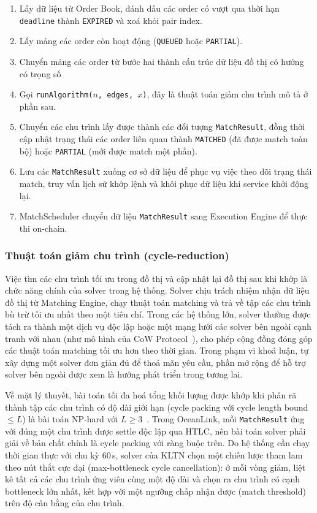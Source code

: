 \begin{enumerate}
    \item Lấy dữ liệu từ Order Book, đánh dấu các order có vượt qua thời hạn \texttt{deadline} thành \texttt{EXPIRED} và xoá khỏi pair index.
    \item Lấy mảng các order còn hoạt động (\texttt{QUEUED} hoặc \texttt{PARTIAL}).
    \item Chuyển mảng các order từ bước hai thành cấu trúc dữ liệu đồ thị có hướng có trọng số
    \item Gọi \texttt{runAlgorithm($n$, edges, $x$)}, đây là thuật toán giảm chu trình mô tả ở phần sau.
    \item Chuyển các chu trình lấy được thành các đối tượng \texttt{MatchResult}, đồng thời cập nhật trạng thái các order liên quan thành \texttt{MATCHED} (đã được match toàn bộ) hoặc \texttt{PARTIAL} (mới được match một phần).
    \item Lưu các \texttt{MatchResult} xuống cơ sở dữ liệu để phục vụ việc theo dõi trạng thái match, truy vấn lịch sử khớp lệnh và khôi phục dữ liệu khi service khởi động lại.
    \item MatchScheduler chuyển dữ liệu \texttt{MatchResult} sang Execution Engine để thực thi on-chain.
\end{enumerate}

\subsubsection{Thuật toán giảm chu trình (cycle-reduction)}

Việc tìm các chu trình tối ưu trong đồ thị và cập nhật lại đồ thị sau khi khớp
là chức năng chính của solver trong hệ thống.
Solver chịu trách nhiệm
nhận dữ liệu đồ thị từ Matching Engine, 
chạy thuật toán matching và trả về
tập các chu trình bù trừ tối ưu nhất theo một tiêu chí. 
Trong các hệ
thống lớn, solver thường được tách ra thành một dịch vụ độc lập hoặc
một mạng lưới các
solver bên ngoài cạnh tranh với nhau (như mô hình của CoW Protocol~\cite{cow_protocol_docs}),
cho phép cộng
đồng đóng góp các thuật toán matching tối ưu hơn theo thời gian.
Trong phạm vi
khoá luận, tự xây dựng một solver đơn giản đủ để thoả mãn yêu cầu, phần mở
rộng để hỗ trợ solver bên ngoài được xem là hướng phát triển trong tương lai.

Về mặt lý thuyết, bài toán tối đa hoá tổng khối lượng được khớp khi phân rã
thành tập các chu trình có độ dài giới hạn (cycle packing với cycle length
bound $\le L$) là bài toán NP-hard với $L \ge 3$~\cite{abraham2007kidney}.
Trong OceanLink, mỗi \texttt{MatchResult} ứng với đúng một chu trình được
settle độc lập qua HTLC, nên bài toán solver phải giải về bản chất chính là
cycle packing với ràng buộc trên. Do hệ thống cần chạy thời gian thực với
chu kỳ 60\,s, solver của KLTN chọn một chiến lược tham lam theo nút thắt cực
đại (max-bottleneck cycle cancellation): ở mỗi vòng giảm, liệt kê tất cả các
chu trình ứng viên cùng một độ dài và chọn ra chu trình có cạnh bottleneck lớn
nhất, kết hợp với một ngưỡng chấp nhận được (match threshold) trên độ cân
bằng của chu trình.

